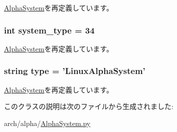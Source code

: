 \hyperlink{classAlphaSystem_1_1AlphaSystem_a0f86e3835b8bf2135faf7b1bab968494}{AlphaSystem}を再定義しています。\hypertarget{classAlphaSystem_1_1LinuxAlphaSystem_acfe3506cfe10e05a2cb2c2973dc5dad2}{
\subsubsection[{system\_\-type}]{\setlength{\rightskip}{0pt plus 5cm}int system\_\-type = 34}}
\label{classAlphaSystem_1_1LinuxAlphaSystem_acfe3506cfe10e05a2cb2c2973dc5dad2}


\hyperlink{classAlphaSystem_1_1AlphaSystem_af401252d15d9cecde29d1fdcbaba250d}{AlphaSystem}を再定義しています。\hypertarget{classAlphaSystem_1_1LinuxAlphaSystem_acce15679d830831b0bbe8ebc2a60b2ca}{
\subsubsection[{type}]{\setlength{\rightskip}{0pt plus 5cm}string type = '{\bf LinuxAlphaSystem}'}}
\label{classAlphaSystem_1_1LinuxAlphaSystem_acce15679d830831b0bbe8ebc2a60b2ca}


\hyperlink{classAlphaSystem_1_1AlphaSystem_acce15679d830831b0bbe8ebc2a60b2ca}{AlphaSystem}を再定義しています。

このクラスの説明は次のファイルから生成されました:\begin{DoxyCompactItemize}
\item 
arch/alpha/\hyperlink{AlphaSystem_8py}{AlphaSystem.py}\end{DoxyCompactItemize}
